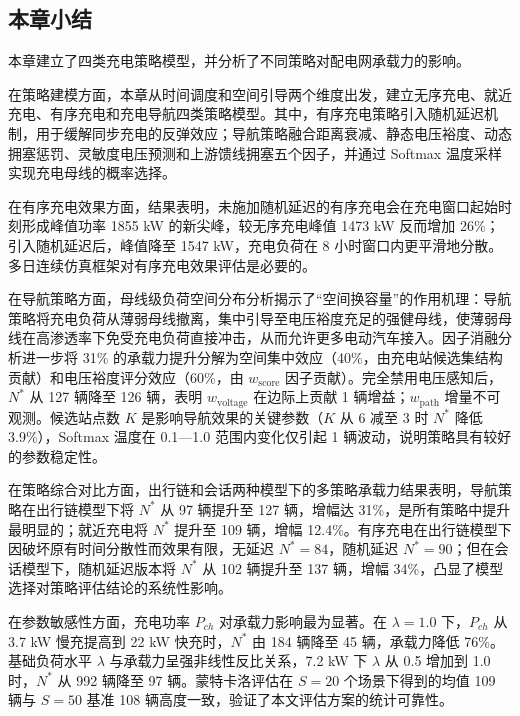 \documentclass[10pt,a4paper]{article}
\numberwithin{equation}{section}
\numberwithin{table}{section}
\numberwithin{figure}{section}
\begin{document}
    \subsection{本章小结}

    本章建立了四类充电策略模型，并分析了不同策略对配电网承载力的影响。

    在策略建模方面，本章从时间调度和空间引导两个维度出发，建立无序充电、就近充电、有序充电和充电导航四类策略模型。其中，有序充电策略引入随机延迟机制，用于缓解同步充电的反弹效应；导航策略融合距离衰减、静态电压裕度、动态拥塞惩罚、灵敏度电压预测和上游馈线拥塞五个因子，并通过 Softmax 温度采样实现充电母线的概率选择。

    在有序充电效果方面，结果表明，未施加随机延迟的有序充电会在充电窗口起始时刻形成峰值功率 1855 kW 的新尖峰，较无序充电峰值 1473 kW 反而增加 26\%；引入随机延迟后，峰值降至 1547 kW，充电负荷在 8 小时窗口内更平滑地分散。多日连续仿真框架对有序充电效果评估是必要的。

    在导航策略方面，母线级负荷空间分布分析揭示了“空间换容量”的作用机理：导航策略将充电负荷从薄弱母线撤离，集中引导至电压裕度充足的强健母线，使薄弱母线在高渗透率下免受充电负荷直接冲击，从而允许更多电动汽车接入。因子消融分析进一步将 31\% 的承载力提升分解为空间集中效应（40\%，由充电站候选集结构贡献）和电压裕度评分效应（60\%，由 $w_{\text{score}}$ 因子贡献）。完全禁用电压感知后，$N^*$ 从 127 辆降至 126 辆，表明 $w_{\text{voltage}}$ 在边际上贡献 1 辆增益；$w_{\text{path}}$ 增量不可观测。候选站点数 $K$ 是影响导航效果的关键参数（$K$ 从 6 减至 3 时 $N^*$ 降低 3.9\%），Softmax 温度在 0.1—1.0 范围内变化仅引起 1 辆波动，说明策略具有较好的参数稳定性。

    在策略综合对比方面，出行链和会话两种模型下的多策略承载力结果表明，导航策略在出行链模型下将 $N^*$ 从 97 辆提升至 127 辆，增幅达 31\%，是所有策略中提升最明显的；就近充电将 $N^*$ 提升至 109 辆，增幅 12.4\%。有序充电在出行链模型下因破坏原有时间分散性而效果有限，无延迟 $N^* = 84$，随机延迟 $N^* = 90$；但在会话模型下，随机延迟版本将 $N^*$ 从 102 辆提升至 137 辆，增幅 34\%，凸显了模型选择对策略评估结论的系统性影响。

    在参数敏感性方面，充电功率 $P_{ch}$ 对承载力影响最为显著。在 $\lambda = 1.0$ 下，$P_{ch}$ 从 3.7 kW 慢充提高到 22 kW 快充时，$N^*$ 由 184 辆降至 45 辆，承载力降低 76\%。基础负荷水平 $\lambda$ 与承载力呈强非线性反比关系，7.2 kW 下 $\lambda$ 从 0.5 增加到 1.0 时，$N^*$ 从 992 辆降至 97 辆。蒙特卡洛评估在 $S = 20$ 个场景下得到的均值 109 辆与 $S = 50$ 基准 108 辆高度一致，验证了本文评估方案的统计可靠性。

    \clearpage
\end{document}
